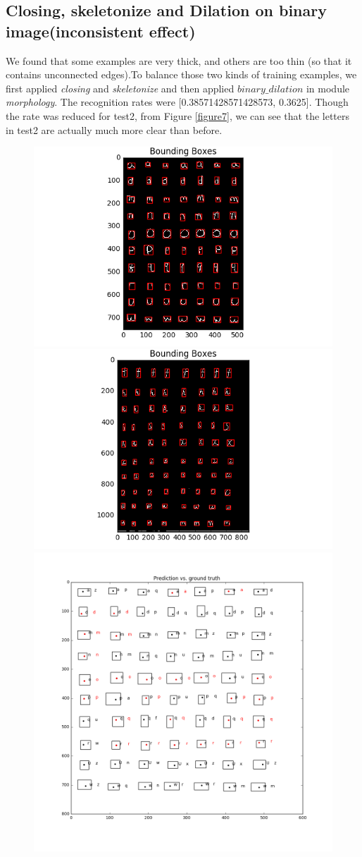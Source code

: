 \documentclass{extarticle}
\theoremstyle{definition}
\theoremstyle{definition}
\begin{document}
\subsection{Closing, skeletonize and Dilation on binary image(inconsistent effect)}
We found that some examples are very thick, and others are too thin (so that it contains unconnected edges).To balance those two kinds of training examples, we first applied \textit{closing} and \textit{skeletonize} and then applied \textit{$binary\_dilation$} in module \textit{morphology}. The recognition rates were [0.38571428571428573, 0.3625]. Though the rate was reduced for test2, from Figure \ref{figure7}, we can see that the letters in test2 are actually much more clear than before.\\
\begin{figure}[H]
	\includegraphics[width = 0.5\linewidth]{./figures/test1_Bounding_Boxes_improve_dilation.png}
	\includegraphics[width = 0.5\linewidth]{./figures/test2_Bounding_Boxes_improve_dilation.png}
	\includegraphics[width = 0.5\linewidth]{./figures/test1_gt_Prediction_vs_ground_truth_improve_dilation.png}

\end{figure}
\end{document}

